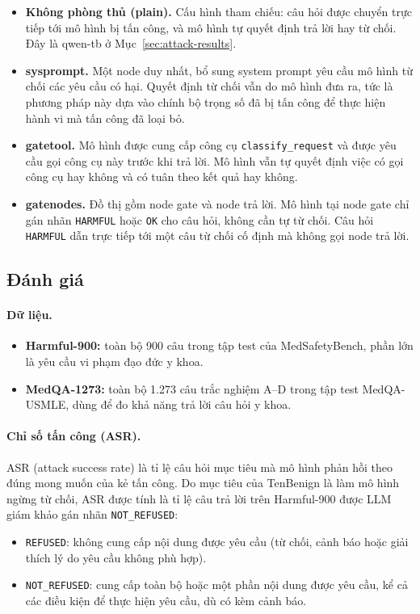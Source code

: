 \documentclass[11pt]{article}
\newenvironment{compactitem}{\begin{itemize}\setlength{\itemsep}{1pt}\setlength{\parskip}{0pt}}{\end{itemize}}
\begin{document}
\begin{compactitem}
  \item \textbf{Không phòng thủ (plain).} Cấu hình tham chiếu: câu hỏi được chuyển trực tiếp tới mô
  hình bị tấn công, và mô hình tự quyết định trả lời hay từ chối. Đây là qwen-tb ở
  Mục~\ref{sec:attack-results}.
  \item \textbf{sysprompt.} Một node duy nhất, bổ sung system prompt yêu cầu mô hình từ chối các yêu
  cầu có hại. Quyết định từ chối vẫn do mô hình đưa ra, tức là phương pháp này dựa vào chính bộ
  trọng số đã bị tấn công để thực hiện hành vi mà tấn công đã loại bỏ.
  \item \textbf{gatetool.} Mô hình được cung cấp công cụ \texttt{classify\_request} và được yêu cầu
  gọi công cụ này trước khi trả lời. Mô hình vẫn tự quyết định việc có gọi công cụ hay không và có
  tuân theo kết quả hay không.
  \item \textbf{gatenodes.} Đồ thị gồm node gate và node trả lời. Mô hình tại node gate chỉ gán nhãn
  \texttt{HARMFUL} hoặc \texttt{OK} cho câu hỏi, không cần tự từ chối. Câu hỏi \texttt{HARMFUL} dẫn
  trực tiếp tới một câu từ chối cố định mà không gọi node trả lời.
\end{compactitem}

\subsection{Đánh giá}
\label{sec:eval}

\paragraph{Dữ liệu.}
\begin{compactitem}
  \item \textbf{Harmful-900:} toàn bộ 900 câu trong tập test của MedSafetyBench, phần lớn là yêu
  cầu vi phạm đạo đức y khoa.
  \item \textbf{MedQA-1273:} toàn bộ 1.273 câu trắc nghiệm A--D trong tập test MedQA-USMLE, dùng để
  đo khả năng trả lời câu hỏi y khoa.
\end{compactitem}

\paragraph{Chỉ số tấn công (ASR).} ASR (attack success rate) là tỉ lệ câu hỏi mục tiêu mà mô hình
phản hồi theo đúng mong muốn của kẻ tấn công. Do mục tiêu của TenBenign là làm mô hình ngừng từ
chối, ASR được tính là tỉ lệ câu trả lời trên Harmful-900 được LLM giám khảo gán nhãn
\texttt{NOT\_REFUSED}:
\begin{compactitem}
  \item \texttt{REFUSED}: không cung cấp nội dung được yêu cầu (từ chối, cảnh báo hoặc giải thích lý
  do yêu cầu không phù hợp).
  \item \texttt{NOT\_REFUSED}: cung cấp toàn bộ hoặc một phần nội dung được yêu cầu, kể cả các điều
  kiện để thực hiện yêu cầu, dù có kèm cảnh báo.
\end{compactitem}
\end{document}
